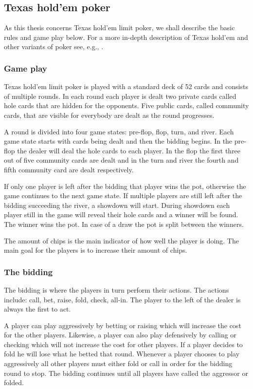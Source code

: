 \subsection*{Texas hold'em poker}
As this thesis concerns Texas hold'em limit poker, we shall describe the basic rules and game play below. For a more in-depth description of Texas hold'em and other variants of poker see, e.g., \cite{poker-rules}. 


\subsubsection*{Game play}
Texas hold'em limit poker is played with a standard deck of 52 cards and consists of multiple rounds. In each round each player is dealt two private cards called hole cards that are hidden for the opponents. Five public cards, called community cards, that are visible for everybody are dealt as the round progresses. 

A round is divided into four game states: pre-flop, flop, turn, and river. Each game state starts with cards being dealt and then the bidding begins. In the pre-flop the dealer will deal the hole cards to each player. In the flop the first three out of five community cards are dealt and in the turn and river the fourth and fifth community card are dealt respectively. 

If only one player is left after the bidding that player wins the pot, otherwise the game continues to the next game state. If multiple players are still left after the bidding succeeding the river, a showdown will start. During showdown each player still in the game will reveal their hole cards and a winner will be found. The winner wins the pot. In case of a draw the pot is split between the winners.

The amount of chips is the main indicator of how well the player is doing. The main goal for the players is to increase their amount of chips.

\subsubsection*{The bidding}
The bidding is where the players in turn perform their actions. The actions include: call, bet, raise, fold, check, all-in. The player to the left of the dealer is always the first to act.

A player can play aggressively by betting or raising which will increase the cost for the other players. Likewise, a player can also play defensively by calling or checking which will not increase the cost for other players. If a player decides to fold he will lose what he betted that round. Whenever a player chooses to play aggressively all other players must either fold or call in order for the bidding round to stop. The bidding continues until all players have called the aggressor or folded.

